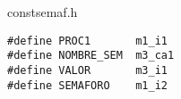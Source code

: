 constsemaf.h

\begin{verbatim}
#define PROC1 		m1_i1
#define NOMBRE_SEM	m3_ca1
#define VALOR		m3_i1
#define SEMAFORO	m1_i2
\end{verbatim}
